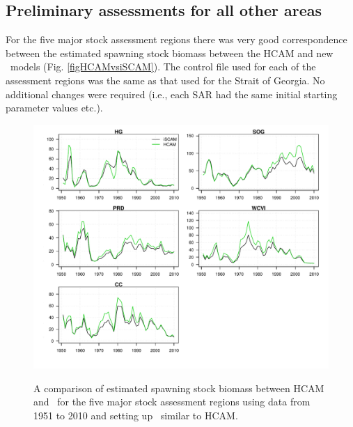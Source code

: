 	
	\subsection{Preliminary assessments for all other areas}
	For the five major stock assessment regions there was very good correspondence between the estimated spawning stock biomass between the HCAM and new \iscam\  models (Fig. \ref{figHCAMvsiSCAM}). The control file used for each of the assessment regions was the same as that used for the Strait of Georgia.  No additional changes were required (i.e., each SAR had the same initial starting parameter values etc.).

\begin{figure}[htbp]
	\centering
		\includegraphics[width=\textwidth]{../Figs/iscam_fig_SBt_iSCAMvsHCAM.pdf}\\
	\caption{A comparison of estimated spawning stock biomass between HCAM and \iscam\ for the five major stock assessment regions using data from 1951 to 2010 and setting up \iscam\ similar to HCAM.}
	\label{fig:iSCAMvsHCAM}
\end{figure}

\clearpage
